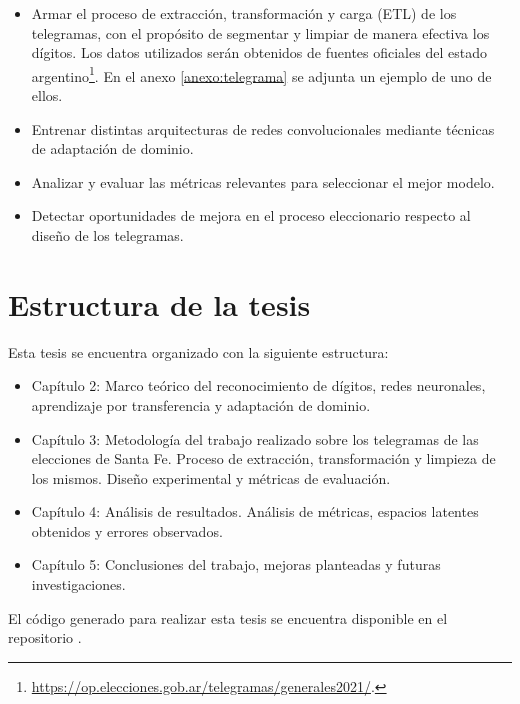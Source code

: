 \begin{itemize}
    \item Armar el proceso de extracción, transformación y carga (ETL) de los telegramas, con el propósito de segmentar y limpiar
          de manera efectiva los dígitos. Los datos utilizados serán obtenidos de fuentes oficiales del estado
          argentino\footnote{\href{https://op.elecciones.gob.ar/telegramas/generales2021/}{https://op.elecciones.gob.ar/telegramas/generales2021/}.}.
          En el anexo \ref{anexo:telegrama} se adjunta un ejemplo de uno de ellos.
    \item Entrenar distintas arquitecturas de redes convolucionales mediante técnicas de adaptación de dominio.
    \item Analizar y evaluar las métricas relevantes para seleccionar el mejor modelo.
    \item Detectar oportunidades de mejora en el proceso eleccionario respecto al diseño de los telegramas.
\end{itemize}

\section{Estructura de la tesis}

Esta tesis se encuentra organizado con la siguiente estructura:

\begin{itemize}
    \item Capítulo 2: Marco teórico del reconocimiento de dígitos, redes neuronales, aprendizaje por transferencia y adaptación
          de dominio.
    \item Capítulo 3: Metodología del trabajo realizado sobre los telegramas de las elecciones de Santa Fe. Proceso de
          extracción, transformación y limpieza de los mismos. Diseño experimental y métricas de evaluación.
    \item Capítulo 4: Análisis de resultados. Análisis de métricas, espacios latentes obtenidos y errores observados.
    \item Capítulo 5: Conclusiones del trabajo, mejoras planteadas y futuras investigaciones.
\end{itemize}

El código generado para realizar esta tesis se encuentra disponible en el repositorio
\citet{ocr-using-domain-adaptation}.